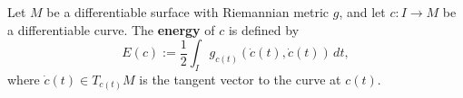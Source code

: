 Let $M$ be a differentiable surface with Riemannian metric $g$, and let $c: I \to M$ be a differentiable curve. The \textbf{energy} of $c$ is defined by
$$E(c) := \frac{1}{2} \int_I g_{c(t)}(\dot{c}(t), \dot{c}(t)) \, dt,$$
where $\dot{c}(t) \in T_{c(t)} M$ is the tangent vector to the curve at $c(t)$.
